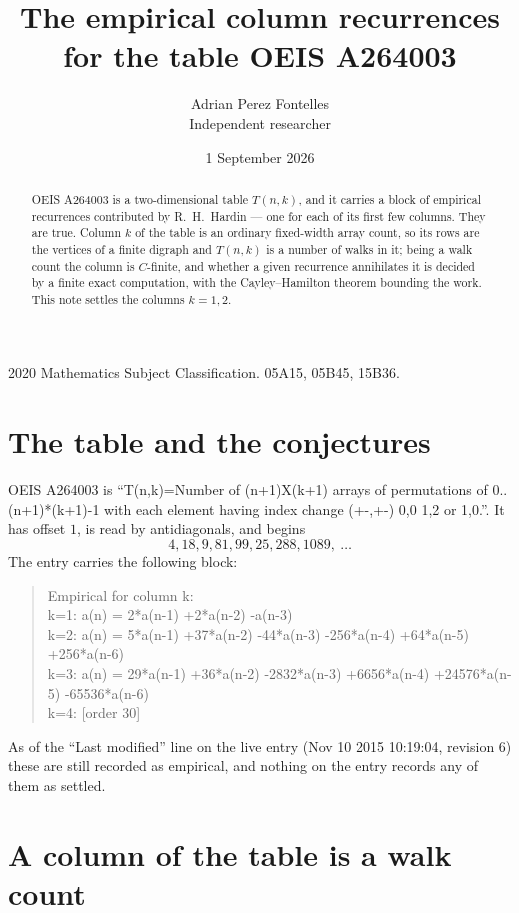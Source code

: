 \documentclass[11pt,a4paper]{article}
\title{The empirical column recurrences for the table OEIS A264003}
\author{Adrian Perez Fontelles\\ \small Independent researcher}
\date{1 September 2026}
\theoremstyle{plain}
\theoremstyle{definition}
\begin{document}
\maketitle

\begin{abstract}
OEIS A264003 is a two-dimensional table $T(n,k)$, and it carries a block of empirical
recurrences contributed by R.~H.~Hardin --- one for each of its first few columns. They are
true. Column $k$ of the table is an ordinary fixed-width array count, so its rows are the
vertices of a finite digraph and $T(n,k)$ is a number of walks in it; being a walk count the
column is $C$-finite, and whether a given recurrence annihilates it is decided by a finite
exact computation, with the Cayley--Hamilton theorem bounding the work. This note settles the columns $k=1, 2$.
\end{abstract}

\noindent\small 2020 Mathematics Subject Classification. 05A15, 05B45, 15B36.\normalsize

\section{The table and the conjectures}

OEIS A264003 is ``T(n,k)=Number of (n+1)X(k+1) arrays of permutations of 0..(n+1)*(k+1)-1 with each element having index change (+-,+-) 0,0 1,2 or 1,0.''. It has offset $1$, is
read by antidiagonals, and begins
\[
4, 18, 9, 81, 99, 25, 288, 1089,\ \dots
\]
The entry carries the following block:
\begin{quote}\small
Empirical for column k:\\
k=1: a(n) = 2*a(n-1) +2*a(n-2) -a(n-3)\\
k=2: a(n) = 5*a(n-1) +37*a(n-2) -44*a(n-3) -256*a(n-4) +64*a(n-5) +256*a(n-6)\\
k=3: a(n) = 29*a(n-1) +36*a(n-2) -2832*a(n-3) +6656*a(n-4) +24576*a(n-5) -65536*a(n-6)\\
k=4: [order 30]\\
\end{quote}
As of the ``Last modified'' line on the live entry (Nov 10 2015 10:19:04, revision 6) these are still
recorded as empirical, and nothing on the entry records any of them as settled.

\section{A column of the table is a walk count}
\end{document}
